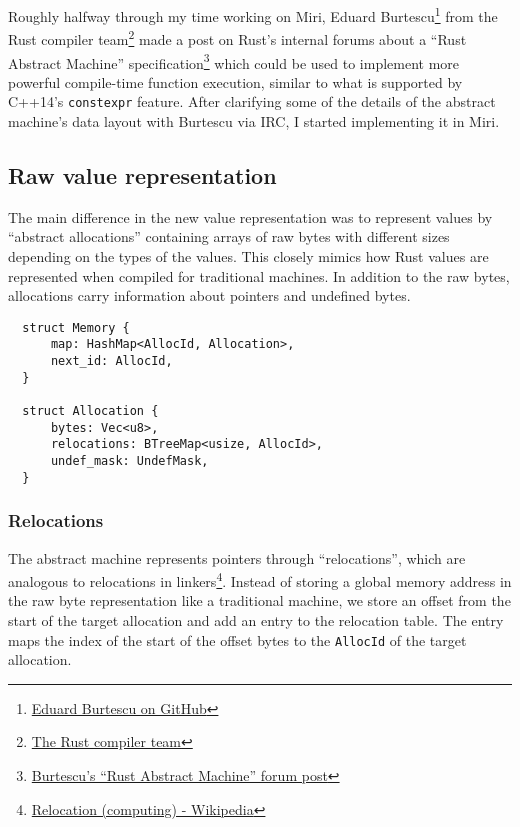 \documentclass[twocolumn]{article}
\newcommand{\rust}[1]{\texttt{#1}}
\begin{document}
Roughly halfway through my time working on Miri, Eduard
Burtescu\footnote{\href{https://github.com/eddyb}{Eduard Burtescu on GitHub}} from the Rust compiler
team\footnote{\href{https://www.rust-lang.org/team.html\#Compiler}{The Rust compiler team}} made a
post on Rust's internal forums about a ``Rust Abstract Machine''
specification\footnote{\href{https://internals.rust-lang.org/t/mir-constant-evaluation/3143/31}{Burtescu's
``Rust Abstract Machine'' forum post}} which could be used to implement more powerful compile-time
function execution, similar to what is supported by C++14's \texttt{constexpr} feature.
After clarifying some of the details of the abstract machine's data layout with Burtescu via IRC, I
started implementing it in Miri.

\subsection{Raw value representation}

The main difference in the new value representation was to represent values by ``abstract
allocations'' containing arrays of raw bytes with different sizes depending on the types of the
values. This closely mimics how Rust values are represented when compiled for traditional machines.
In addition to the raw bytes, allocations carry information about pointers and undefined bytes.

\begin{verbatim}
  struct Memory {
      map: HashMap<AllocId, Allocation>,
      next_id: AllocId,
  }

  struct Allocation {
      bytes: Vec<u8>,
      relocations: BTreeMap<usize, AllocId>,
      undef_mask: UndefMask,
  }
\end{verbatim}

\subsubsection{Relocations}

The abstract machine represents pointers through ``relocations'', which are analogous to relocations
in linkers\footnote{\href{https://en.wikipedia.org/wiki/Relocation_(computing)}{Relocation
(computing) - Wikipedia}}. Instead of storing a global memory address in the raw byte representation
like a traditional machine, we store an offset from the start of the target allocation and add an
entry to the relocation table. The entry maps the index of the start of the offset bytes to the
\rust{AllocId} of the target allocation.
\end{document}
